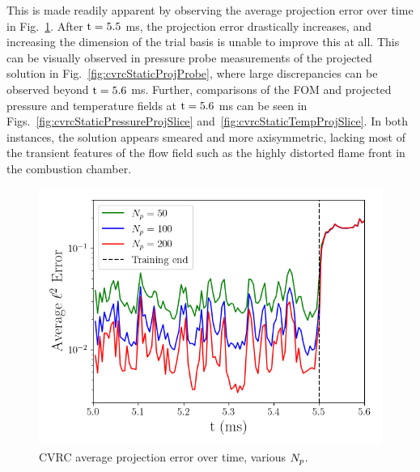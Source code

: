 This is made readily apparent by observing the average projection error over time in Fig.~\ref{fig:cvrcStaticProjTime}. After $\text{t} = 5.5$ ms, the projection error drastically increases, and increasing the dimension of the trial basis is unable to improve this at all. This can be visually observed in pressure probe measurements of the projected solution in Fig.~\ref{fig:cvrcStaticProjProbe}, where large discrepancies can be observed beyond $\text{t} = 5.6$ ms. Further, comparisons of the FOM and projected pressure and temperature fields at $\text{t} = 5.6$ ms can be seen in Figs.~\ref{fig:cvrcStaticPressureProjSlice} and~\ref{fig:cvrcStaticTempProjSlice}. In both instances, the solution appears smeared and more axisymmetric, lacking most of the transient features of the flow field such as the  highly distorted flame front in the combustion chamber.

\begin{figure}
    \centering
    \includegraphics[width=0.75\linewidth]{Chapters/AdaptiveResults/Images/cvrc/proj_err_time.png}
    \caption{\label{fig:cvrcStaticProjTime}CVRC average projection error over time, various $N_p$.}
\end{figure}

